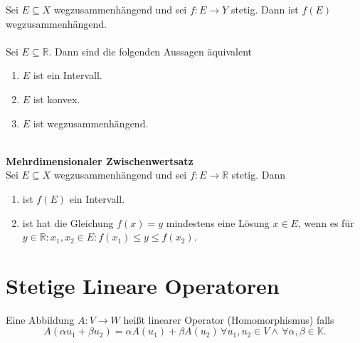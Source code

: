 \documentclass[a4paper,12pt]{article}
\begin{document}
Sei $E\subseteq X$ wegzusammenhängend und sei $f:E\rightarrow Y$ stetig. Dann ist $f(E)$ wegzusammenhängend.\\\\\indent
Sei $E\subseteq \mathbb{R}$. Dann sind die folgenden Aussagen äquivalent
\begin{enumerate}[label=\arabic*.]
        \item $E$ ist ein Intervall.
        \item $E$ ist konvex.
        \item $E$ ist wegzusammenhängend.
\end{enumerate}
\hfill\\\textbf{Mehrdimensionaler Zwischenwertsatz}\\ 
Sei $E\subseteq X$ wegzusammenhängend und sei $f:E\rightarrow \mathbb{R}$ stetig. Dann
\begin{enumerate}[label=\arabic*.]
        \item ist $f(E)$ ein Intervall.
        \item ist hat die Gleichung $f(x)=y$ mindestens eine Lösung $x \in E$, wenn es für $y \in \mathbb{R}:x_1,x_2 \in E:f(x_1)\leq y\leq f(x_2)$.
\end{enumerate}

\section{Stetige Lineare Operatoren}
Eine Abbildung $A:V\rightarrow W$ heißt linearer Operator (Homomorphismus) falls
\[ 
        A(\alpha u_1+\beta u_2)=\alpha A(u_1)+\beta A(u_2)\,\forall u_1,u_2 \in V\land \,\forall \alpha ,\beta  \in \mathbb{K}
.\] 
\end{document}
